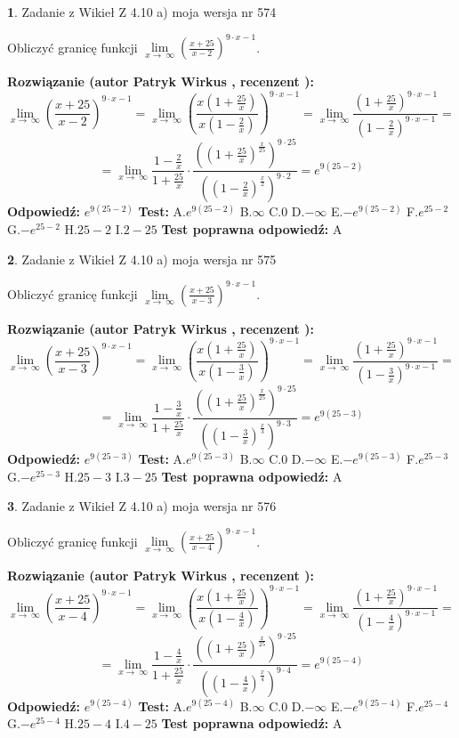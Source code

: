 \documentclass[12pt, a4paper]{article}
\theoremstyle{definition} %
\newtheorem{zad}{}
\newcommand{\zadStart}[1]{\begin{zad}#1\newline}
\newcommand{\zadStop}{\end{zad}}
\newcommand{\rozwStart}[2]{\noindent \textbf{Rozwiązanie (autor #1 , recenzent #2): }\newline}
\newcommand{\rozwStop}{\newline}
\newcommand{\odpStart}{\noindent \textbf{Odpowiedź:}\newline}
\newcommand{\odpStop}{\newline}
\newcommand{\testStart}{\noindent \textbf{Test:}\newline}
\newcommand{\testStop}{\newline}
\newcommand{\kluczStart}{\noindent \textbf{Test poprawna odpowiedź:}\newline}
\newcommand{\kluczStop}{\newline}
\begin{document}
\zadStart{Zadanie z Wikieł Z 4.10 a) moja wersja nr 574}


Obliczyć granicę funkcji  $\lim\limits_{x\to\ \infty}(\frac{x+25}{x-2})^{9\cdot x-1}$.
\zadStop
\rozwStart{Patryk Wirkus}{}
$$\lim\limits_{x\to\ \infty}(\frac{x+25}{x-2})^{9\cdot x-1} = \lim\limits_{x\to\ \infty}(\frac{x(1+\frac{25}{x})}{x(1-\frac{2}{x})})^{9\cdot x-1}=\lim\limits_{x\to\ \infty}\frac{(1+\frac{25}{x})^{9\cdot x-1}}{(1-\frac{2}{x})^{9\cdot x-1}}=$$
$$=\lim\limits_{x\to\ \infty}\frac{1-\frac{2}{x}}{1+\frac{25}{x}}\cdot\frac{((1+\frac{25}{x})^{\frac{x}{25}})^{9\cdot25}}{((1-\frac{2}{x})^{\frac{x}{2}})^{9\cdot2}}=e^{9(25-2)}$$
\rozwStop
\odpStart
$e^{9(25-2)}$
\odpStop
\testStart
A.$e^{9(25-2)}$ B.$\infty$ C.$0$ D.$-\infty$ E.$-e^{9(25-2)}$
F.$e^{25-2}$ G.$-e^{25-2}$
H.$25-2$
I.$2-25$
\testStop
\kluczStart
A
\kluczStop



\zadStart{Zadanie z Wikieł Z 4.10 a) moja wersja nr 575}


Obliczyć granicę funkcji  $\lim\limits_{x\to\ \infty}(\frac{x+25}{x-3})^{9\cdot x-1}$.
\zadStop
\rozwStart{Patryk Wirkus}{}
$$\lim\limits_{x\to\ \infty}(\frac{x+25}{x-3})^{9\cdot x-1} = \lim\limits_{x\to\ \infty}(\frac{x(1+\frac{25}{x})}{x(1-\frac{3}{x})})^{9\cdot x-1}=\lim\limits_{x\to\ \infty}\frac{(1+\frac{25}{x})^{9\cdot x-1}}{(1-\frac{3}{x})^{9\cdot x-1}}=$$
$$=\lim\limits_{x\to\ \infty}\frac{1-\frac{3}{x}}{1+\frac{25}{x}}\cdot\frac{((1+\frac{25}{x})^{\frac{x}{25}})^{9\cdot25}}{((1-\frac{3}{x})^{\frac{x}{3}})^{9\cdot3}}=e^{9(25-3)}$$
\rozwStop
\odpStart
$e^{9(25-3)}$
\odpStop
\testStart
A.$e^{9(25-3)}$ B.$\infty$ C.$0$ D.$-\infty$ E.$-e^{9(25-3)}$
F.$e^{25-3}$ G.$-e^{25-3}$
H.$25-3$
I.$3-25$
\testStop
\kluczStart
A
\kluczStop



\zadStart{Zadanie z Wikieł Z 4.10 a) moja wersja nr 576}


Obliczyć granicę funkcji  $\lim\limits_{x\to\ \infty}(\frac{x+25}{x-4})^{9\cdot x-1}$.
\zadStop
\rozwStart{Patryk Wirkus}{}
$$\lim\limits_{x\to\ \infty}(\frac{x+25}{x-4})^{9\cdot x-1} = \lim\limits_{x\to\ \infty}(\frac{x(1+\frac{25}{x})}{x(1-\frac{4}{x})})^{9\cdot x-1}=\lim\limits_{x\to\ \infty}\frac{(1+\frac{25}{x})^{9\cdot x-1}}{(1-\frac{4}{x})^{9\cdot x-1}}=$$
$$=\lim\limits_{x\to\ \infty}\frac{1-\frac{4}{x}}{1+\frac{25}{x}}\cdot\frac{((1+\frac{25}{x})^{\frac{x}{25}})^{9\cdot25}}{((1-\frac{4}{x})^{\frac{x}{4}})^{9\cdot4}}=e^{9(25-4)}$$
\rozwStop
\odpStart
$e^{9(25-4)}$
\odpStop
\testStart
A.$e^{9(25-4)}$ B.$\infty$ C.$0$ D.$-\infty$ E.$-e^{9(25-4)}$
F.$e^{25-4}$ G.$-e^{25-4}$
H.$25-4$
I.$4-25$
\testStop
\kluczStart
A
\kluczStop
\end{document}
